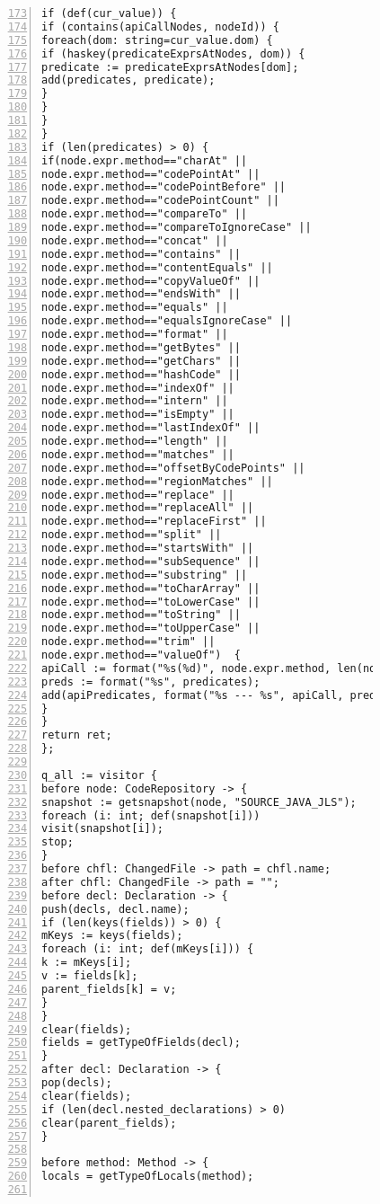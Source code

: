 \begin{figure}[ht!]
\begin{lstlisting}[numbers=left, tabsize=4, escapechar=@, caption={API Precondition Mining Analysis},label={lst:apm-code}, firstline = 173, firstnumber = 173, lastline = 234]
if (def(cur_value)) {
if (contains(apiCallNodes, nodeId)) {
foreach(dom: string=cur_value.dom) {
if (haskey(predicateExprsAtNodes, dom)) {
predicate := predicateExprsAtNodes[dom];
add(predicates, predicate);
}
}
}
}
if (len(predicates) > 0) {
if(node.expr.method=="charAt" ||  
node.expr.method=="codePointAt" || 
node.expr.method=="codePointBefore" || 
node.expr.method=="codePointCount" || 
node.expr.method=="compareTo" || 
node.expr.method=="compareToIgnoreCase" || 
node.expr.method=="concat" || 
node.expr.method=="contains" || 
node.expr.method=="contentEquals" || 
node.expr.method=="copyValueOf" || 
node.expr.method=="endsWith" || 
node.expr.method=="equals" || 
node.expr.method=="equalsIgnoreCase" || 
node.expr.method=="format" || 
node.expr.method=="getBytes" || 
node.expr.method=="getChars" || 
node.expr.method=="hashCode" || 
node.expr.method=="indexOf" || 
node.expr.method=="intern" || 
node.expr.method=="isEmpty" || 
node.expr.method=="lastIndexOf" || 
node.expr.method=="length" || 
node.expr.method=="matches" || 
node.expr.method=="offsetByCodePoints" || 
node.expr.method=="regionMatches" || 
node.expr.method=="replace" || 
node.expr.method=="replaceAll" || 
node.expr.method=="replaceFirst" || 
node.expr.method=="split" ||  
node.expr.method=="startsWith" ||  
node.expr.method=="subSequence" || 
node.expr.method=="substring" || 
node.expr.method=="toCharArray" || 
node.expr.method=="toLowerCase" || 
node.expr.method=="toString" || 
node.expr.method=="toUpperCase" || 
node.expr.method=="trim" || 
node.expr.method=="valueOf")  {
apiCall := format("%s(%d)", node.expr.method, len(node.expr.method_args));
preds := format("%s", predicates);
add(apiPredicates, format("%s --- %s", apiCall, preds));
}
}
return ret;
};

q_all := visitor {
before node: CodeRepository -> {
snapshot := getsnapshot(node, "SOURCE_JAVA_JLS");
foreach (i: int; def(snapshot[i]))
visit(snapshot[i]);
stop;
}
before chfl: ChangedFile -> path = chfl.name;
after chfl: ChangedFile -> path = "";
before decl: Declaration -> {
push(decls, decl.name);
if (len(keys(fields)) > 0) {
mKeys := keys(fields);    
foreach (i: int; def(mKeys[i])) {
k := mKeys[i];
v := fields[k];
parent_fields[k] = v;
}
}
clear(fields);
fields = getTypeOfFields(decl);
}
after decl: Declaration -> {
pop(decls);
clear(fields);
if (len(decl.nested_declarations) > 0)
clear(parent_fields);
}

before method: Method -> {
locals = getTypeOfLocals(method);


\end{lstlisting}
\end{figure}
